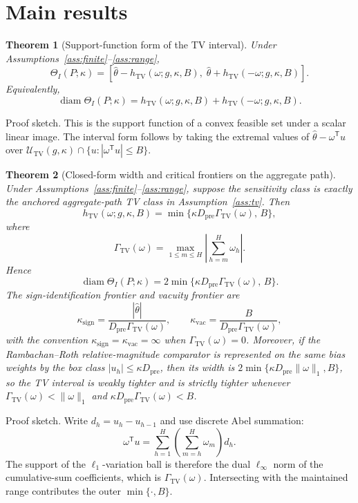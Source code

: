 \documentclass[11pt]{article}
\newcommand{\transpose}{\mathsf{T}}
\theoremstyle{definition}
\theoremstyle{plain}
\newtheorem{theorem}{Theorem}
\theoremstyle{remark}
\begin{document}
\section{Main results}
\begin{theorem}[Support-function form of the TV interval]\label{thm:support}
Under Assumptions~\ref{ass:finite}--\ref{ass:range},
\[
\Theta_I(P;\kappa)
=
\left[
\hat\theta-h_{\mathrm{TV}}(\omega;g,\kappa,B),\;
\hat\theta+h_{\mathrm{TV}}(-\omega;g,\kappa,B)
\right].
\]
Equivalently,
\[
\operatorname{diam}\Theta_I(P;\kappa)
=
h_{\mathrm{TV}}(\omega;g,\kappa,B)+h_{\mathrm{TV}}(-\omega;g,\kappa,B).
\]
\end{theorem}
\noindent
Proof sketch. This is the support function of a convex feasible set under a scalar linear image. The interval form follows by taking the extremal values of \(\hat\theta-\omega^\transpose u\) over \(\mathcal U_{\mathrm{TV}}(g,\kappa)\cap\{u:|\omega^\transpose u|\le B\}\).

\begin{theorem}[Closed-form width and critical frontiers on the aggregate path]\label{thm:closedform}
Under Assumptions~\ref{ass:finite}--\ref{ass:range}, suppose the sensitivity class is exactly the anchored aggregate-path TV class in Assumption~\ref{ass:tv}. Then
\[
h_{\mathrm{TV}}(\omega;g,\kappa,B)
=
\min\{\kappa D_{\mathrm{pre}}\Gamma_{\mathrm{TV}}(\omega),\, B\},
\]
where
\[
\Gamma_{\mathrm{TV}}(\omega)
=
\max_{1\le m\le H}
\left|
\sum_{h=m}^H \omega_h
\right|.
\]
Hence
\[
\operatorname{diam}\Theta_I(P;\kappa)
=
2\min\{\kappa D_{\mathrm{pre}}\Gamma_{\mathrm{TV}}(\omega),\, B\}.
\]
The sign-identification frontier and vacuity frontier are
\[
\kappa_{\mathrm{sign}}
=
\frac{|\hat\theta|}{D_{\mathrm{pre}}\Gamma_{\mathrm{TV}}(\omega)},
\qquad
\kappa_{\mathrm{vac}}
=
\frac{B}{D_{\mathrm{pre}}\Gamma_{\mathrm{TV}}(\omega)},
\]
with the convention \(\kappa_{\mathrm{sign}}=\kappa_{\mathrm{vac}}=\infty\) when \(\Gamma_{\mathrm{TV}}(\omega)=0\).
Moreover, if the Rambachan--Roth relative-magnitude comparator is represented on the same bias weights by the box class \(|u_h|\le \kappa D_{\mathrm{pre}}\), then its width is \(2\min\{\kappa D_{\mathrm{pre}}\|\omega\|_1,B\}\), so the TV interval is weakly tighter and is strictly tighter whenever \(\Gamma_{\mathrm{TV}}(\omega)<\|\omega\|_1\) and \(\kappa D_{\mathrm{pre}}\Gamma_{\mathrm{TV}}(\omega)<B\).
\end{theorem}
\noindent
Proof sketch. Write \(d_h=u_h-u_{h-1}\) and use discrete Abel summation:
\[
\omega^\transpose u
=
\sum_{h=1}^H\left(\sum_{m=h}^H\omega_m\right)d_h.
\]
The support of the \(\ell_1\)-variation ball is therefore the dual \(\ell_\infty\) norm of the cumulative-sum coefficients, which is \(\Gamma_{\mathrm{TV}}(\omega)\). Intersecting with the maintained range contributes the outer \(\min\{\cdot,B\}\).
\end{document}
